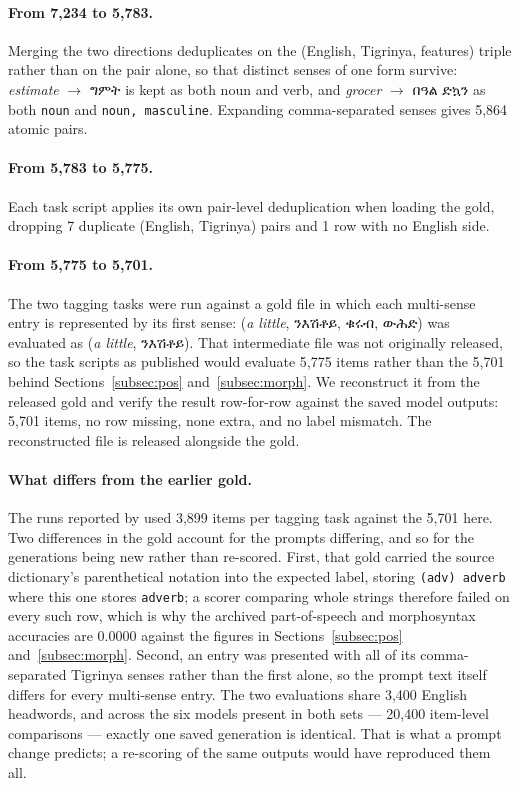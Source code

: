 \documentclass[11pt]{article}
\newcommand{\ti}[1]{{\geezfont #1}}
\newcommand{\ti}[1]{\texttt{[ge'ez]}}
\begin{document}
\paragraph{From 7,234 to 5,783.} Merging the two directions deduplicates on
the (English, Tigrinya, features) triple rather than on the pair alone, so
that distinct senses of one form survive: \emph{estimate} $\rightarrow$
\ti{ግምት} is kept as both noun and verb, and \emph{grocer} $\rightarrow$
\ti{በዓል ድኳን} as both \texttt{noun} and \texttt{noun, masculine}. Expanding
comma-separated senses gives 5,864 atomic pairs.

\paragraph{From 5,783 to 5,775.} Each task script applies its own pair-level
deduplication when loading the gold, dropping 7 duplicate (English, Tigrinya)
pairs and 1 row with no English side.

\paragraph{From 5,775 to 5,701.} The two tagging tasks were run against a
gold file in which each multi-sense entry is represented by its first sense:
(\emph{a little}, \ti{ንእሽቶይ}, \ti{ቁሩብ}, \ti{ውሕድ}) was evaluated as
(\emph{a little}, \ti{ንእሽቶይ}). That intermediate file was not originally
released, so the task scripts as published would evaluate 5,775 items rather
than the 5,701 behind Sections~\ref{subsec:pos} and~\ref{subsec:morph}. We
reconstruct it from the released gold and verify the result row-for-row
against the saved model outputs: 5,701 items, no row missing, none extra, and
no label mismatch. The reconstructed file is released alongside the gold.

\paragraph{What differs from the earlier gold.} The runs reported by
\citet{llmprobe-2026} used 3,899 items per tagging task against the 5,701
here. Two differences in the gold account for the prompts differing, and so
for the generations being new rather than re-scored. First, that gold
carried the source dictionary's parenthetical notation into the expected
label, storing \texttt{(adv)~adverb} where this one stores
\texttt{adverb}; a scorer comparing whole strings therefore failed on every
such row, which is why the archived part-of-speech and morphosyntax
accuracies are 0.0000 against the figures in
Sections~\ref{subsec:pos} and~\ref{subsec:morph}. Second, an entry was
presented with all of its comma-separated Tigrinya senses rather than the
first alone, so the prompt text itself differs for every multi-sense entry.
The two evaluations share 3,400 English headwords, and across the six models
present in both sets --- 20,400 item-level comparisons --- exactly one saved
generation is identical. That is what a prompt change predicts; a re-scoring
of the same outputs would have reproduced them all.
\end{document}
